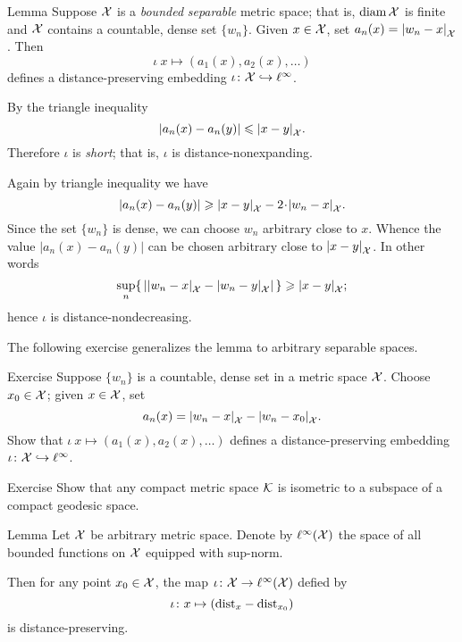\begin{thm}{Lemma}\label{lem:frechet}
Suppose $\mathcal{X}$ is a \emph{bounded} \emph{separable} metric space;
that is, $\operatorname{\rm diam}\nolimits\mathcal{X}$ is finite and $\mathcal{X}$ contains a countable, dense set $\{w_n\}$.
Given $x\in \mathcal{X}$, set $a_n(x)=\dist{w_n}{x}{\spc{X}}$.
Then 
\[\iota\:x\mapsto (a_1(x), a_2(x),\dots)\]
defines a distance-preserving embedding $\iota\colon\mathcal{X}\hookrightarrow \ell^\infty$.
\end{thm}

By the triangle inequality 
\[|a_n(x)-a_n(y)|\le \dist{x}{y}{\spc{X}}.\]
Therefore $\iota$ is \emph{short}; that is, $\iota$ is distance-nonexpanding.

Again by triangle inequality we have 
\[|a_n(x)-a_n(y)|\ge \dist{x}{y}{\spc{X}}-2\cdot\dist{w_n}{x}{\spc{X}}.\]
Since the set $\{w_n\}$ is dense, we can choose $w_n$ arbitrary close to $x$.
Whence the value $|a_n(x)-a_n(y)|$ can be chosen arbitrary close to $\dist{x}{y}{\spc{X}}$.
In other words 
\[\sup_n\{\,|\dist{w_n}{x}{\spc{X}}-\dist{w_n}{y}{\spc{X}}|\,\}\ge \dist{x}{y}{\spc{X}};\]
hence $\iota$ is distance-nondecreasing.
\qeds

The following exercise generalizes the lemma to arbitrary separable spaces.

\begin{thm}{Exercise}\label{ex:frechet}
Suppose $\{w_n\}$ is a countable, dense set in a metric space $\mathcal{X}$.
Choose $x_0\in \mathcal{X}$;
given $x\in \mathcal{X}$, set 
\[a_n(x)=\dist{w_n}{x}{\spc{X}}-\dist{w_n}{x_0}{\spc{X}}.\]
Show that $\iota\:x\mapsto (a_1(x), a_2(x),\dots)$ defines a distance-preserving embedding $\iota\colon\mathcal{X}\hookrightarrow \ell^\infty$.
\end{thm}

\begin{thm}{Exercise}\label{ex:compact-length}
Show that any compact metric space $\mathcal{K}$ is isometric to a subspace of a compact geodesic space. 
\end{thm}


\begin{thm}{Lemma}\label{lem:kuratowski}
Let $\mathcal{X}$ be arbitrary metric space.
Denote by $\ell^\infty(\mathcal{X})$ the space of all bounded functions on $\mathcal{X}$ equipped with sup-norm.

Then for any point $x_0\in \mathcal{X}$, the map $\iota\colon\mathcal{X}\to \ell^\infty(\mathcal{X})$ defied by 
\[\iota\colon x\mapsto (\mathrm{dist}_x-\mathrm{dist}_{x_0})\]
is distance-preserving.
\end{thm}

